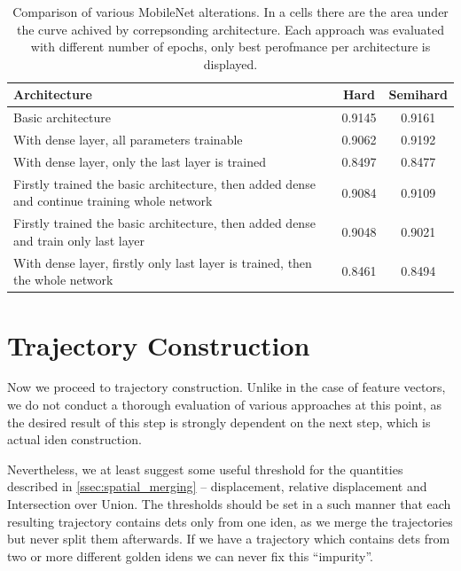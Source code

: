 \begin{table}[]
    \centering
    \begin{tabularx}{\textwidth}{X|c|c}
          Architecture & Hard & Semihard \\
          \hline
         Basic architecture & 0.9145 & 0.9161 \\
         With dense layer, all parameters trainable & 0.9062 & 0.9192 \\
         With dense layer, only the last layer is trained & 0.8497 & 0.8477 \\
         Firstly trained the basic architecture, then added dense and continue training whole network & 0.9084 & 0.9109 \\
         Firstly trained the basic architecture, then added dense and train only last layer & 0.9048 & 0.9021 \\
         With dense layer, firstly only last layer is trained, then the whole network & 0.8461 & 0.8494
    \end{tabularx}
    \caption[Comparison of various MobileNet alterations]{Comparison of various MobileNet alterations. In a cells there are the area under the curve achived by correpsonding architecture. Each approach was evaluated with different number of epochs, only best perofmance per architecture is displayed.}
    \label{tab:final_comparison}
\end{table}


\section{Trajectory Construction}

Now we proceed to trajectory construction. Unlike in the case of feature vectors, we do not conduct a thorough evaluation of various approaches at this point, as the desired result of this step is strongly dependent on the next step, which is actual \gls{iden} construction.

Nevertheless, we at least suggest some useful threshold for the quantities described in \autoref{ssec:spatial_merging} -- displacement, relative displacement and Intersection over Union. The thresholds should be set in a such manner that each resulting trajectory contains \glspl{det} only from one \gls{iden}, as we merge the trajectories but never split them afterwards. If we have a trajectory which contains \glspl{det} from two or more different golden \glspl{iden} we can never fix this ``impurity''.

